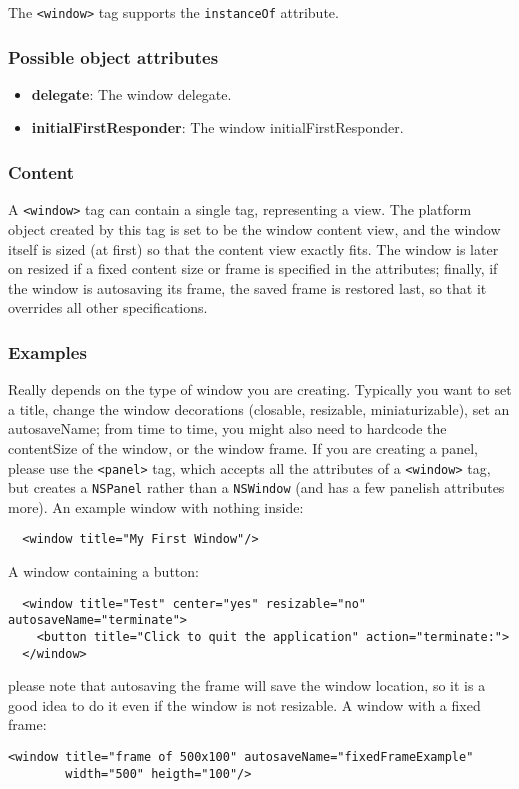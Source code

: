 The \texttt{<window>} tag supports the \texttt{instanceOf} attribute.

\subsubsection{Possible object attributes}
\begin{itemize}
\item {\bf delegate}: The window delegate.
\item {\bf initialFirstResponder}: The window initialFirstResponder.
\end{itemize}

\subsubsection{Content}
A \texttt{<window>} tag can contain a single tag, representing a view.
The platform object created by this tag is set to be the window
content view, and the window itself is sized (at first) so that the
content view exactly fits.  The window is later on resized if a fixed
content size or frame is specified in the attributes; finally, if the
window is autosaving its frame, the saved frame is restored last, so
that it overrides all other specifications.

\subsubsection{Examples}
Really depends on the type of window you are creating.  Typically you
want to set a title, change the window decorations (closable,
resizable, miniaturizable), set an autosaveName; from time to time,
you might also need to hardcode the contentSize of the window, or the
window frame.  If you are creating a panel, please use the
\texttt{<panel>} tag, which accepts all the attributes of a \texttt{<window>}
tag, but creates a \texttt{NSPanel} rather than a \texttt{NSWindow}
(and has a few panelish attributes more).  An example window with
nothing inside:
\begin{verbatim}
  <window title="My First Window"/>
\end{verbatim}
A window containing a button:
\begin{verbatim}
  <window title="Test" center="yes" resizable="no" autosaveName="terminate">
    <button title="Click to quit the application" action="terminate:">
  </window>
\end{verbatim}
please note that autosaving the frame will save the window location,
so it is a good idea to do it even if the window is not resizable.  A
window with a fixed frame:
\begin{verbatim}
<window title="frame of 500x100" autosaveName="fixedFrameExample"
        width="500" heigth="100"/>
\end{verbatim}

